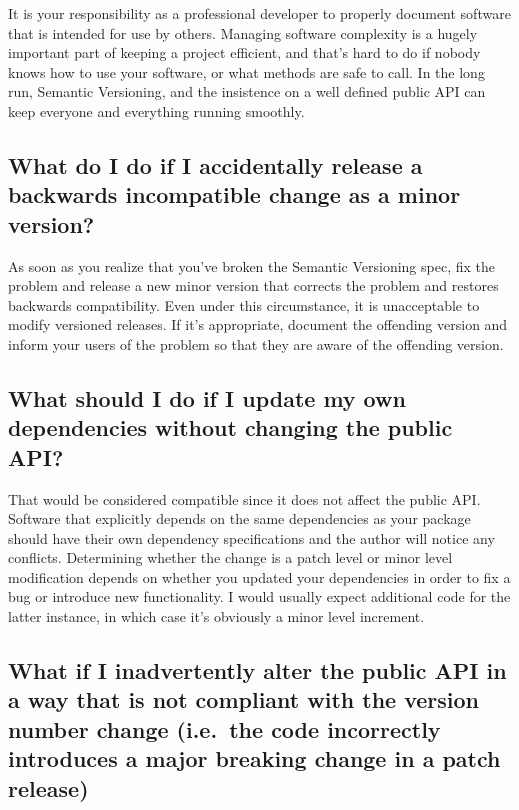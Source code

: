 \documentclass[a4paper,12pt,notitlepage,twoside,openright]{article}
\begin{document}
It is your responsibility as a professional developer to properly
document software that is intended for use by others. Managing software
complexity is a hugely important part of keeping a project efficient,
and that's hard to do if nobody knows how to use your software, or what
methods are safe to call. In the long run, Semantic Versioning, and the
insistence on a well defined public API can keep everyone and everything
running smoothly.

\hypertarget{what-do-i-do-if-i-accidentally-release-a-backwards-incompatible-change-as-a-minor-version}{%
\subsection{What do I do if I accidentally release a backwards
incompatible change as a minor
version?}\label{what-do-i-do-if-i-accidentally-release-a-backwards-incompatible-change-as-a-minor-version}}

As soon as you realize that you've broken the Semantic Versioning spec,
fix the problem and release a new minor version that corrects the
problem and restores backwards compatibility. Even under this
circumstance, it is unacceptable to modify versioned releases. If it's
appropriate, document the offending version and inform your users of the
problem so that they are aware of the offending version.

\hypertarget{what-should-i-do-if-i-update-my-own-dependencies-without-changing-the-public-api}{%
\subsection{What should I do if I update my own dependencies without
changing the public
API?}\label{what-should-i-do-if-i-update-my-own-dependencies-without-changing-the-public-api}}

That would be considered compatible since it does not affect the public
API. Software that explicitly depends on the same dependencies as your
package should have their own dependency specifications and the author
will notice any conflicts. Determining whether the change is a patch
level or minor level modification depends on whether you updated your
dependencies in order to fix a bug or introduce new functionality. I
would usually expect additional code for the latter instance, in which
case it's obviously a minor level increment.

\hypertarget{what-if-i-inadvertently-alter-the-public-api-in-a-way-that-is-not-compliant-with-the-version-number-change-i.e.-the-code-incorrectly-introduces-a-major-breaking-change-in-a-patch-release}{%
\subsection{What if I inadvertently alter the public API in a way
that is not compliant with the version number change (i.e.~the code
incorrectly introduces a major breaking change in a patch
release)}\label{what-if-i-inadvertently-alter-the-public-api-in-a-way-that-is-not-compliant-with-the-version-number-change-i.e.-the-code-incorrectly-introduces-a-major-breaking-change-in-a-patch-release}}
\end{document}

